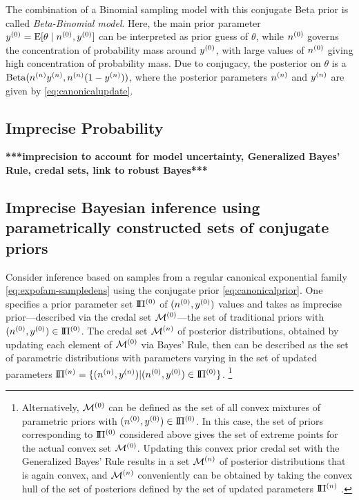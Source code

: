 The combination of a Binomial sampling model with this conjugate Beta prior is called \emph{Beta-Binomial model}.
Here, the main prior parameter $y^{(0)} = \operatorname{E}[\theta\mid n^{(0)}, y^{(0)}]$ can be interpreted as prior guess of $\theta$,
while $n^{(0)}$ governs the concentration of probability mass around $y^{(0)}$,
with large values of $n^{(0)}$ giving high concentration of probability mass.
Due to conjugacy, the posterior on $\theta$ is a $\operatorname{Beta}(n^{(n)}y^{(n)}, n^{(n)}(1-y^{(n)}))$,
where the posterior parameters $n^{(n)}$ and $y^{(n)}$ are given by \eqref{eq:canonicalupdate}.

\subsection{Imprecise Probability}

\textbf{***imprecision to account for model uncertainty, Generalized Bayes' Rule, credal sets, link to robust Bayes***}


\subsection{Imprecise Bayesian inference using parametrically constructed sets of conjugate priors}
\label{sec:ip-conjugateframework}

Consider inference based on samples from a regular canonical exponential family \eqref{eq:expofam-sampledens}
using the conjugate prior \eqref{eq:canonicalprior}.
One specifies a prior parameter set $\text{I}\!\Pi^{(0)}$ of $(n^{(0)},y^{(0)})$ values
and takes as imprecise prior---described via the credal set $\mathcal{M}^{(0)}$---the set of traditional priors with $(n^{(0)}, y^{(0)}) \in \text{I}\!\Pi^{(0)}$.
The credal set $\mathcal{M}^{(n)}$ of posterior distributions,
obtained by updating each element of $\mathcal{M}^{(0)}$ via Bayes' Rule,
then can be described as the set of parametric distributions
with parameters varying in the set of updated parameters $\text{I}\!\Pi^{(n)} = \{(n^{(n)},y^{(n)}) \vert (n^{(0)}, y^{(0)}) \in \text{I}\!\Pi^{(0)}\}$.%
\footnote{Alternatively, $\mathcal{M}^{(0)}$ can be defined as the set of all convex mixtures of parametric priors with $(n^{(0)}, y^{(0)}) \in \text{I}\!\Pi^{(0)}$.
In this case, the set of priors corresponding to $\text{I}\!\Pi^{(0)}$ considered above gives the set of extreme points for the actual convex set $\mathcal{M}^{(0)}$.
Updating this convex prior credal set with the Generalized Bayes' Rule results in a set $\mathcal{M}^{(n)}$ of posterior distributions that is again convex,
and $\mathcal{M}^{(n)}$ conveniently can be obtained by taking the convex hull of the set of posteriors
defined by the set of updated parameters $\text{I}\!\Pi^{(n)}$ \cite[p.~56f]{diss-gw}.}

